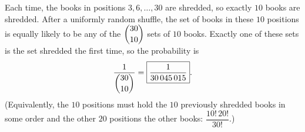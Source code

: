 Each time, the books in positions $3,6,\dots,30$ are shredded, so exactly $10$ books are shredded. After a uniformly random shuffle, the set of books in these $10$ positions is equally likely to be any of the $\dbinom{30}{10}$ sets of $10$ books. Exactly one of these sets is the set shredded the first time, so the probability is
\[\dfrac{1}{\dbinom{30}{10}}=\boxed{\dfrac{1}{30\,045\,015}}.\]
(Equivalently, the $10$ positions must hold the $10$ previously shredded books in some order and the other $20$ positions the other books: $\dfrac{10!\,20!}{30!}$.)
